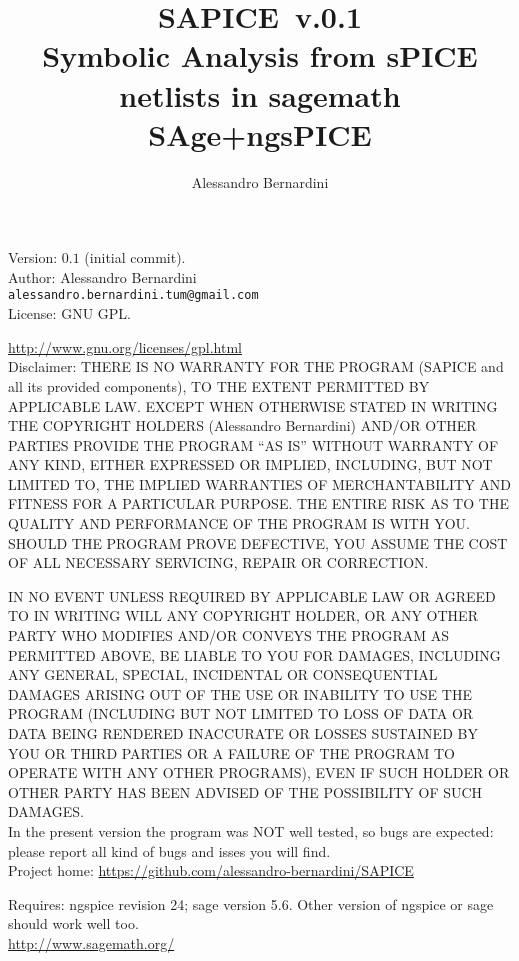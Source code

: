 \documentclass[a4paper]{article}
\title{SAPICE~v.0.1\\ {\normalsize Symbolic Analysis from sPICE netlists in sagemath\\SAge+ngsPICE}}
\author{Alessandro Bernardini}
\begin{document}
\maketitle
Version: $0.1$ (initial commit).\\

Author: Alessandro Bernardini\\

{\tt alessandro.bernardini.tum@gmail.com}\\

License: GNU GPL.

\url{http://www.gnu.org/licenses/gpl.html} \\

Disclaimer: THERE IS NO WARRANTY FOR THE PROGRAM (SAPICE and all its provided components), TO THE EXTENT PERMITTED BY APPLICABLE LAW. EXCEPT WHEN OTHERWISE STATED IN WRITING THE COPYRIGHT HOLDERS (Alessandro Bernardini) AND/OR OTHER PARTIES PROVIDE THE PROGRAM “AS IS” WITHOUT WARRANTY OF ANY KIND, EITHER EXPRESSED OR IMPLIED, INCLUDING, BUT NOT LIMITED TO, THE IMPLIED WARRANTIES OF MERCHANTABILITY AND FITNESS FOR A PARTICULAR PURPOSE. THE ENTIRE RISK AS TO THE QUALITY AND PERFORMANCE OF THE PROGRAM IS WITH YOU. SHOULD THE PROGRAM PROVE DEFECTIVE, YOU ASSUME THE COST OF ALL NECESSARY SERVICING, REPAIR OR CORRECTION.

IN NO EVENT UNLESS REQUIRED BY APPLICABLE LAW OR AGREED TO IN WRITING WILL ANY COPYRIGHT HOLDER, OR ANY OTHER PARTY WHO MODIFIES AND/OR CONVEYS THE PROGRAM AS PERMITTED ABOVE, BE LIABLE TO YOU FOR DAMAGES, INCLUDING ANY GENERAL, SPECIAL, INCIDENTAL OR CONSEQUENTIAL DAMAGES ARISING OUT OF THE USE OR INABILITY TO USE THE PROGRAM (INCLUDING BUT NOT LIMITED TO LOSS OF DATA OR DATA BEING RENDERED INACCURATE OR LOSSES SUSTAINED BY YOU OR THIRD PARTIES OR A FAILURE OF THE PROGRAM TO OPERATE WITH ANY OTHER PROGRAMS), EVEN IF SUCH HOLDER OR OTHER PARTY HAS BEEN ADVISED OF THE POSSIBILITY OF SUCH DAMAGES.\\ 

In the present version the program was NOT well tested, so bugs are expected: please report all kind of bugs and isses you will find.\\

Project home:
\url{https://github.com/alessandro-bernardini/SAPICE}

Requires: ngspice revision 24; sage version 5.6. Other version of ngspice or sage should work well too.\\

\url{http://www.sagemath.org/}
\end{document}

